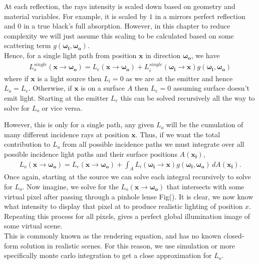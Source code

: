 \documentclass{article}
\begin{document}
At each reflection, the rays intensity is scaled down based on geometry and material variables.
For example, it is scaled by $1$ in a mirrors perfect reflection and $0$ in a true black's full absorption.
However, in this chapter to reduce complexity we will just assume this scaling to be calculated based on some
scattering term $g(\boldsymbol{\omega_i},\boldsymbol{\omega_o})$\label{fn: scattering term}.
\\
Hence, for a single light path from position $\boldsymbol{x}$ in direction $\boldsymbol{\omega_o}$,
we have
\begin{align}
    L_o^{single}(\boldsymbol{x}\rightarrow\boldsymbol{\omega_o}) 
    = L_e(\boldsymbol{x}\rightarrow\boldsymbol{\omega_o}) 
    + L_{i}^{single}(\boldsymbol{\omega_{i}}\rightarrow\boldsymbol{x})
    g(\boldsymbol{\omega_i},\boldsymbol{\omega_o})
\end{align}
where if $\boldsymbol{x}$ is a light source then $L_i=0$ as we are at the emitter and hence $L_o=L_e$.
Otherwise, if $\boldsymbol{x}$ is on a surface $A$ then $L_e=0$ assuming surface doesn't emit light.
Starting at the emitter $L_e$ this can be solved recursively all the way to solve for $L_o$ or vice versa.

However, this is only for a single path, any given $L_o$ will be the cumulation of many different 
incidence rays at position $\boldsymbol{x}$.
Thus, if we want the total contribution to $L_o$ from all possible incidence paths
we must integrate over all possible incidence light paths and their surface positions $A(\boldsymbol{x_i})$,
\begin{align} 
    \label{eq: equation of outgoing intensity}
    L_o(\boldsymbol{x}\rightarrow\boldsymbol{\omega_{o}}) = 
    L_e(\boldsymbol{x}\rightarrow\boldsymbol{\omega_o}) +
    \int_{A} L_{i}(\boldsymbol{\omega_{i}}\rightarrow\boldsymbol{x})
    g(\boldsymbol{\omega_i},\boldsymbol{\omega_o})
    \, dA(\boldsymbol{x_i}).
\end{align}
Once again, starting at the source we can solve each integral recursively to solve for $L_o$.
Now imagine, we solve for the $L_o(\boldsymbol{x}\rightarrow\boldsymbol{\omega_o})$ that intersects 
with some virtual pixel after passing through a pinhole lense Fig().
It is clear, we now know what intensity to display that pixel at to produce realistic lighting of 
position $x$.
Repeating this process for all pixels, gives a perfect global illumination image of some virtual scene.  
\\
This is commonly known as the rendering equation, and has no known closed-form solution 
in realistic scenes.
For this reason, we use simulation or more specifically monte carlo integration to get a close 
approximation for $L_o$. \cite{KajiyaJamesT.1986Tre} 
\end{document}
